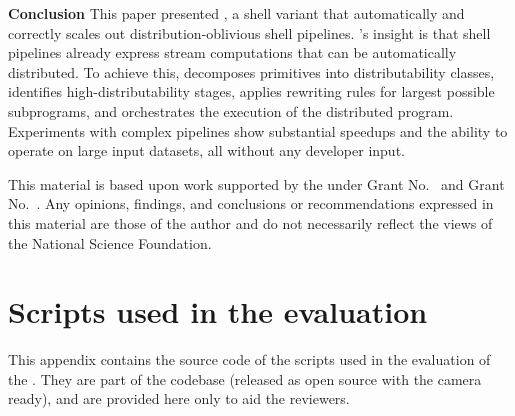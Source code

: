 \documentclass[sigplan,10pt,review,anonymous]{acmart}
\newcommand{\heading}[1]{\vspace{4pt}\noindent\textbf{#1}\enspace}
\newcommand{\kk}[1]{[{\color{magenta}#1 --- kk}]}
\begin{document}

\heading{Conclusion}
This paper presented \sys, a shell variant that automatically and correctly scales out distribution-oblivious shell pipelines. 
\sys's insight is that shell pipelines already express stream computations that can be automatically distributed.
To achieve this, \sys
  decomposes primitives into distributability classes,
  identifies high-distributability stages,
  applies rewriting rules for largest possible subprograms,
  and orchestrates the execution of the distributed program.
Experiments with complex pipelines show substantial speedups and the ability to operate on large input datasets, all without any developer input.

\begin{acks}
  This material is based upon work supported by the
   under Grant
  No.~ and Grant
  No.~.  Any opinions, findings, and
  conclusions or recommendations expressed in this material are those
  of the author and do not necessarily reflect the views of the
  National Science Foundation.
\end{acks}





\appendix
\section{Scripts used in the evaluation}

This appendix contains the source code of the scripts used in the evaluation of
the \sys. They are part of the codebase (released as open source with the camera
ready), and are provided here only to aid the reviewers.
\end{document}
